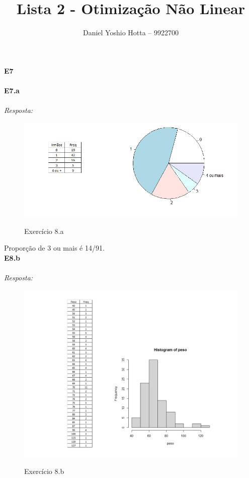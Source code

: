 \documentclass{article}
\begin{document}
	
	\title{Lista 2 - Otimização Não Linear}
	\author{Daniel Yoshio Hotta – 9922700}
	
	\maketitle	
	
	\textbf {E7} 
	\\ \\
	
	\textbf {E7.a} 
	\\ \\
	\textit {Resposta:} \\
    
    
    \begin{figure}[h]
    	\caption{Exercício 8.a}
    	\centering %
    	\includegraphics[width=14cm]{8a.png} %
    	\label{figura: Item A}
	\end{figure}
    
    Proporção de 3 ou mais é 14/91.\\
    
    \textbf {E8.b} 
    \\ \\
    \textit {Resposta:} \\
    
    
    \begin{figure}[h]
    	\caption{Exercício 8.b}
    	\centering %
    	\includegraphics[width=14cm]{8b.png} %
    	\label{figura: Item B}
    \end{figure}
\end{document}
